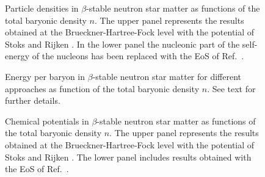\begin{figure}[hbtp]
   \caption{Particle densities in $\beta$-stable neutron star matter
            as functions of the total baryonic density $n$.
            The upper panel represents the results obtained at the 
            Brueckner-Hartree-Fock level with the potential of Stoks and
            Rijken \protect\cite{sr99}. 
            In the  lower panel the nucleonic part of the self-energy of the nucleons
            has been replaced 
            with the EoS of Ref.\ \protect\cite{apr98}. }
   \label{fig:fraction}
\end{figure}

\begin{figure}
   \caption{Energy per baryon in $\beta$-stable neutron star matter for
            different approaches  as function of the total baryonic density $n$.
            See text for further details.}
   \label{fig:eosfig}
\end{figure}



\begin{figure}[hbtp]
   \caption{Chemical potentials in $\beta$-stable neutron star matter
            as functions of the total baryonic density $n$.
            The upper panel represents the results obtained at the 
            Brueckner-Hartree-Fock level with the potential of Stoks and
            Rijken \protect\cite{sr99}. 
            The lower panel includes results obtained
            with the EoS of Ref.\  \protect\cite{apr98}. }
   \label{fig:chempots}
\end{figure}





